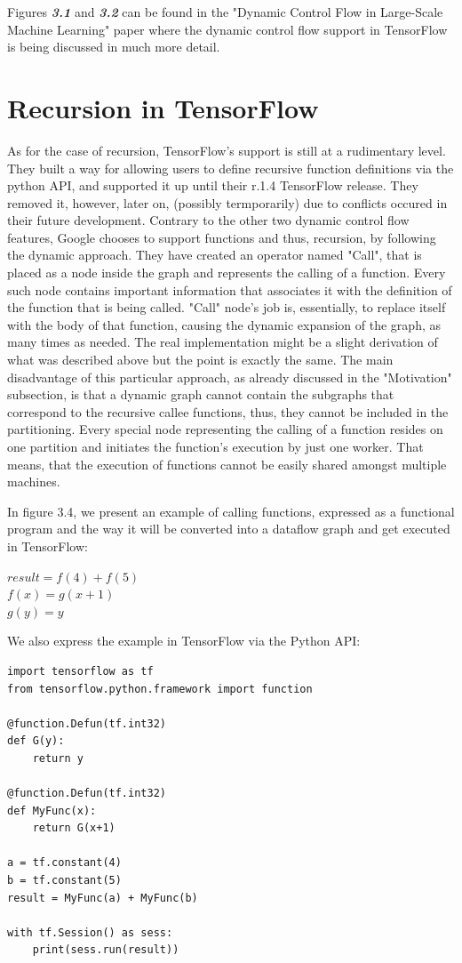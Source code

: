 \documentclass[ack,preface]{dithesis}
\begin{document}
Figures \textit{\textbf{3.1}} and \textit{\textbf{3.2}}  can be found in the "Dynamic Control Flow in Large-Scale Machine Learning" paper  \cite{Yu:2018} where the dynamic control flow support in TensorFlow is being discussed in much more detail. 

\section{Recursion in TensorFlow}
As for the case of recursion, TensorFlow's support is still at a rudimentary level. They built a way for allowing users to define recursive function definitions via the python API,  and supported it up until their r.1.4 TensorFlow release. They removed it, however, later on, (possibly termporarily) due to conflicts occured in their future development. Contrary to the other two dynamic control flow features, Google chooses to support functions and thus, recursion, by following the dynamic approach.  They have created an operator named "Call", that is placed as a node inside the graph and represents the calling of a function. Every such node contains important information that associates it with the definition  of the function that is being called.  "Call" node's job is, essentially,  to replace itself with the body of that function, causing the dynamic expansion of the graph, as many times as needed. The real implementation might be a slight derivation of what was described above but the point is exactly the same.
The main disadvantage of this particular approach, as already discussed in the "Motivation" subsection, is that a dynamic graph  cannot contain the subgraphs that correspond to the recursive callee functions, thus, they cannot be included in the partitioning. Every special node representing the calling of a function resides on one partition and initiates the function's execution by just one worker. That means, that the execution of functions cannot be easily shared amongst multiple machines.

\begin{flushleft}
  In figure 3.4, we present an example of calling functions, expressed as a functional program and the way it will be converted into a dataflow graph and get executed in TensorFlow:

 \setlength{\parindent}{25ex} $result = f(4) + f(5)$ \\
$f(x) = g(x+1)$ \\ 
$g(y) = y$
\end{flushleft}

We also express the example in TensorFlow via the Python API:
\begin{lstlisting}
import tensorflow as tf
from tensorflow.python.framework import function

@function.Defun(tf.int32)
def G(y):
	return y

@function.Defun(tf.int32)
def MyFunc(x):
	return G(x+1)

a = tf.constant(4)
b = tf.constant(5)
result = MyFunc(a) + MyFunc(b)

with tf.Session() as sess:
	print(sess.run(result))
\end{lstlisting}
\end{document}
